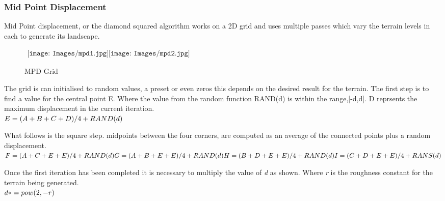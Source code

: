 \subsubsection*{Mid Point Displacement}
Mid Point displacement\cite{MPD}, or the diamond squared algorithm works on a 2D grid
and uses
multiple passes which vary the terrain levels in each to generate its landscape.\\

\begin{figure}[h!]
\begin{center}$
\begin{array}{cc}
\texttt{[image: Images/mpd1.jpg]}
\texttt{[image: Images/mpd2.jpg]}
\end{array}$
\end{center}
\caption{MPD Grid}
\end{figure}

The grid is can initialised to random values, a preset or even zeros this depends on
the desired result for the terrain. The first step is to find a value for the central
point E. Where the value from the random function RAND(d) is within the range,[-d,d].
D reprsents the maximum displacement in the current iteration.\\

\begin{math}
E = (A+B+C+D) / 4 + RAND(d)\\
\end{math}

What follows is the square step. midpoints between the four corners, are computed as
an average of the connected points plus a random displacement.\\

\begin{math}
F = (A + C + E + E) / 4 + RAND(d)\\
G = (A + B + E + E) / 4 + RAND(d)\\
H = (B + D + E + E) / 4 + RAND(d)\\
I = (C + D + E + E) / 4 + RANS(d)\\
\end{math}

Once the first iteration has been completed it is necessary to multiply the value of
\emph{d} as shown. Where \emph{r} is the roughness constant for the terrain being
generated.\\

\begin{math}
d *= pow(2,-r)\\
\end{math}

